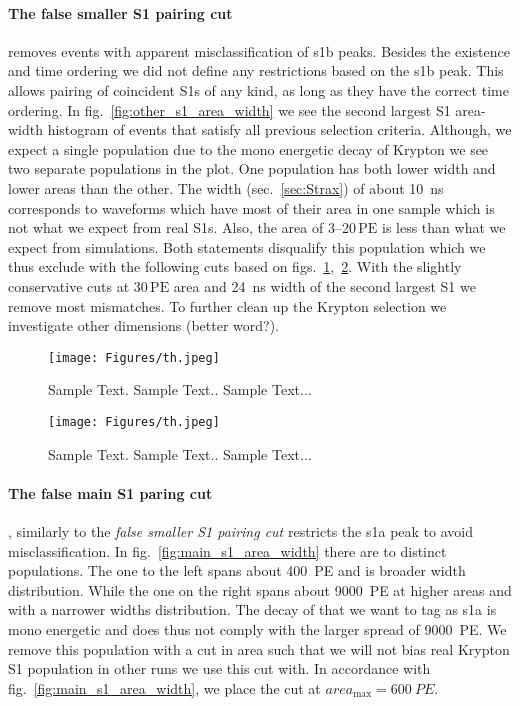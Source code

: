 \paragraph{The false smaller S1 pairing cut} removes events with apparent misclassification of \gls{s1b} peaks.
Besides the existence and time ordering we did not define any restrictions based on the \gls{s1b} peak.
This allows pairing of coincident S1s of any kind, as long as they have the correct time ordering.
In fig.~\ref{fig:other_s1_area_width} we see the second largest S1 area-width histogram of events that satisfy all previous selection criteria.
Although, we expect a single population due to the mono energetic decay of Krypton we see two separate populations in the plot.
One population has both lower width and lower areas than the other.
The width (sec.~\ref{sec:Strax}) of about \SI{10}{\nano\s} corresponds to waveforms which have most of their area in one sample which is not what we expect from real S1s.
Also, the area of \numrange{3}{20}$\,\mathrm{PE}$ is less than what we expect from simulations.
Both statements disqualify this population which we thus exclude with the following cuts based on figs.~\ref{fig:other_s1_area_cut},~\ref{fig:other_s1_width_cut}.
With the slightly conservative cuts at $30\,\mathrm{PE}$ area and \SI{24}{\nano\s} width of the second largest S1 we remove most mismatches.
To further clean up the Krypton selection we investigate other dimensions (better word?).


\begin{figure}[h]
\centering
\texttt{[image: Figures/th.jpeg]}  %
\caption[Other S1 Area Histogram Cut]{
        Sample Text.
        Sample Text..
        Sample Text...
    }
\label{fig:other_s1_area_cut}
\end{figure}


\begin{figure}
\centering
\texttt{[image: Figures/th.jpeg]}  %
\caption[Other S1 Width Histogram Cut]{
        Sample Text.
        Sample Text..
        Sample Text...
    }
\label{fig:other_s1_width_cut}
\end{figure}


\paragraph{The false main S1 paring cut}, similarly to the \emph{false smaller S1 pairing cut} restricts the \gls{s1a} peak to avoid misclassification.
In fig.~\ref{fig:main_s1_area_width} there are to distinct populations.
The one to the left spans about \SI{400}{PE} and is broader width distribution.
While the one on the right spans about \SI{9000}{PE} at higher areas and with a narrower widths distribution.
The decay of  that we want to tag as \gls{s1a} is mono energetic and does thus not comply with the larger spread of \SI{9000}{PE}.
We remove this population with a cut in area such that we will not bias real Krypton S1 population in other runs we use this cut with.
In accordance with fig.~\ref{fig:main_s1_area_width}, we place the cut at $ area_\mathrm{max} = \SI{600}{PE}$.


